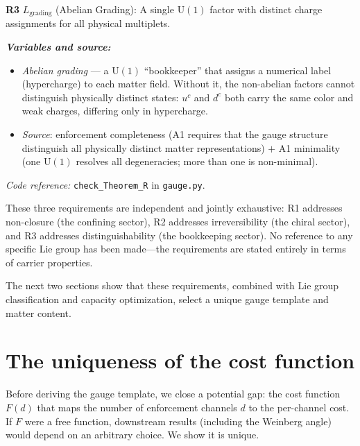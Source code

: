 \documentclass[11pt]{article}
\newenvironment{varlist}{\begin{itemize}[nosep,leftmargin=2em]}{\end{itemize}}
\newcommand{\coderef}[2]{\smallskip\noindent\textit{Code reference:} \texttt{#1} in \texttt{#2}.}
\newcommand{\U}{\mathrm{U}}
\begin{document}
\begin{tcolorbox}[apfbox, title={Theorem R: Representation Requirements from Admissibility}]
\medskip
\textbf{R3} $L_{\mathrm{grading}}$ (Abelian Grading): A single $\U(1)$ factor with distinct charge assignments for all physical multiplets.

\smallskip\noindent\textbf{\textit{Variables and source:}}
\begin{varlist}
\item \textit{Abelian grading} --- a $\U(1)$ ``bookkeeper'' that assigns a numerical label (hypercharge) to each matter field.  Without it, the non-abelian factors cannot distinguish physically distinct states: $u^c$ and $d^c$ both carry the same color and weak charges, differing only in hypercharge.
\item \textit{Source}: enforcement completeness (A1 requires that the gauge structure distinguish all physically distinct matter representations) $+$ A1 minimality (one $\U(1)$ resolves all degeneracies; more than one is non-minimal).
\end{varlist}

\coderef{check\_Theorem\_R}{gauge.py}
\end{tcolorbox}


These three requirements are independent and jointly exhaustive: R1 addresses non-closure (the confining sector), R2 addresses irreversibility (the chiral sector), and R3 addresses distinguishability (the bookkeeping sector).  No reference to any specific Lie group has been made---the requirements are stated entirely in terms of carrier properties.

The next two sections show that these requirements, combined with Lie group classification and capacity optimization, select a unique gauge template and matter content.



\section{The uniqueness of the cost function}
\label{sec:cauchy}

Before deriving the gauge template, we close a potential gap: the cost function $F(d)$ that maps the number of enforcement channels $d$ to the per-channel cost.  If $F$ were a free function, downstream results (including the Weinberg angle) would depend on an arbitrary choice.  We show it is unique.
\end{document}

